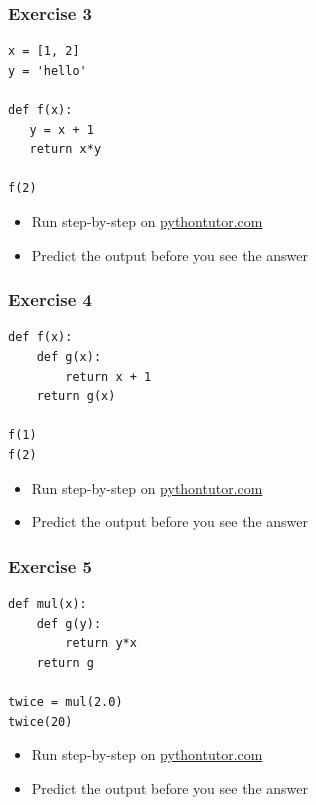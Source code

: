 \documentclass[14pt,compress]{beamer}
\begin{document}
\begin{frame}[fragile]
  \frametitle{Exercise 3}
\begin{lstlisting}
x = [1, 2]
y = 'hello'

def f(x):
   y = x + 1
   return x*y

f(2)
\end{lstlisting}
\vspace*{0.1in}
  \begin{itemize}
  \item Run step-by-step on \url{pythontutor.com}
  \item Predict the output before you see the answer
  \end{itemize}

\end{frame}

\begin{frame}[fragile]
  \frametitle{Exercise 4}
\begin{lstlisting}
def f(x):
    def g(x):
        return x + 1
    return g(x)

f(1)
f(2)
\end{lstlisting}
\vspace*{0.1in}
  \begin{itemize}
  \item Run step-by-step on \url{pythontutor.com}
  \item Predict the output before you see the answer
  \end{itemize}

\end{frame}

\begin{frame}[fragile]
  \frametitle{Exercise 5}
\begin{lstlisting}
def mul(x):
    def g(y):
        return y*x
    return g

twice = mul(2.0)
twice(20)
\end{lstlisting}
\vspace*{0.1in}
  \begin{itemize}
  \item Run step-by-step on \url{pythontutor.com}
  \item Predict the output before you see the answer
  \end{itemize}

\end{frame}
\end{document}
